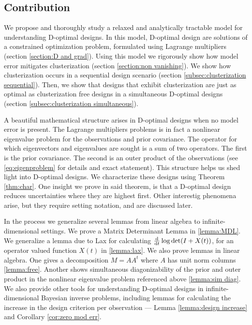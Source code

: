 \documentclass{amsart}
\numberwithin{equation}{section}
\begin{document}
\subsection{Contribution}
We propose and thoroughly study a relaxed and analytically tractable
model for understanding D-optimal designs. In this model, D-optimal
design are solutions of a constrained optimization problem, formulated
using Lagrange multipliers (section \ref{section:D and grad}). Using
this model we rigorously show how model error mitigates clusterization
(section \ref{section:non vanishing}). We show how clusterization
occurs in a sequential design scenario (section
\ref{subsec:clusterization sequential}). Then, we show that designs
that exhibit clusterization are just as optimal as clusterization free
designs in a simultaneous D-optimal designs (section
\ref{subsec:clusterization simultaneous}).

A beautiful mathematical structure arises in D-optimal designs when no
model error is present. The Lagrange multipliers problems is in fact a
nonlinear eigenvalue problem for the observations and prior
covariance. The operator for which eigenvectors and eigenvalues are
sought is a sum of two operators. The first is the prior
covariance. The second is an outer product of the observations (see
\eqref{eq:eigenproblem} for details and exact statement). This
structure helps us shed light into D-optimal designs. We characterize
these designs using Theorem \ref{thm:char}. One insight we prove in
said theorem, is that a D-optimal design reduces uncertainties where
they are highest first. Other interestig phenomena arise, but they
require setting notation, and are discussed later.

In the process we generalize several lemmas from linear algebra to
infinite-dimensional settings. We prove a Matrix Determinant Lemma in
\ref{lemma:MDL}. We generalize a lemma due to Lax \cite{lax97} for
calculating $\frac{\text{\textup{d}}}{\text{\textup{d}} t} \log \det (I + X(t))$, for an
operator valued function $X(t)$ in \ref{lemma:lax}. We also prove
lemmas in linear algebra. One gives a decomposition $M = AA^t$ where
$A$ has unit norm columns \ref{lemma:free}. Another shows simultaneous
diagonizability of the prior and outer product in the nonlinear
eigenvalue problem referenced above \ref{lemma:sim diag}. We also
provide other tools for understanding D-optimal designs in
infinite-dimensional Bayesian inverse problems, including lemmas for
calculating the increase in the design criterion per observation ---
Lemma \ref{lemma:design increase} and Corollary \ref{cor:zero mod
  err}.
\end{document}
